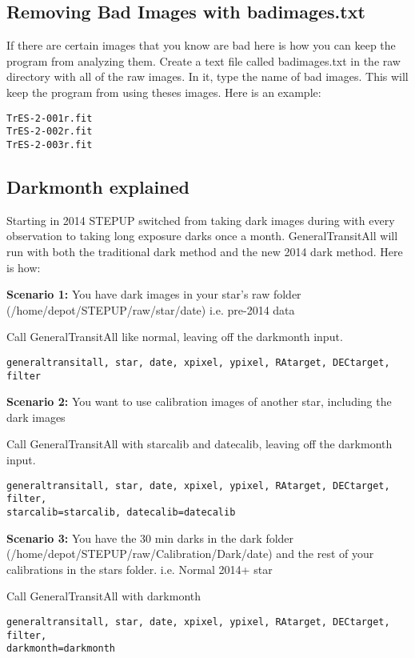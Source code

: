 \documentclass[10pt,preprint]{aastex}
\begin{document}
\subsection{Removing Bad Images with badimages.txt}

If there are certain images that you know are bad here is how you can keep the program from analyzing them. Create a text file called badimages.txt in the raw directory with all of the raw images. In it, type the name of bad images. This will keep the program from using theses images. Here is an example: 

\begin{verbatim}
TrES-2-001r.fit
TrES-2-002r.fit
TrES-2-003r.fit
\end{verbatim}

\subsection{Darkmonth explained}
Starting in 2014 STEPUP switched from taking dark images during with every observation to taking long exposure darks once a month. GeneralTransitAll will run with both the traditional dark method and the new 2014 dark method. Here is how:


\textbf{Scenario 1:} You have dark images in your star's raw folder (/home/depot/STEPUP/raw/star/date) i.e. pre-2014 data

Call GeneralTransitAll like normal, leaving off the darkmonth input.
\begin{verbatim}
generaltransitall, star, date, xpixel, ypixel, RAtarget, DECtarget, filter
\end{verbatim}

\textbf{Scenario 2:} You want to use calibration images of another star, including the dark images

Call GeneralTransitAll with starcalib and datecalib, leaving off the darkmonth input.
\begin{verbatim}
generaltransitall, star, date, xpixel, ypixel, RAtarget, DECtarget, filter,
starcalib=starcalib, datecalib=datecalib
\end{verbatim}

\textbf{Scenario 3:} You have the 30 min darks in the dark folder (/home/depot/STEPUP/raw/Calibration/Dark/date) and the rest of your calibrations in the stars folder. i.e. Normal 2014+ star 

Call GeneralTransitAll with darkmonth
\begin{verbatim}
generaltransitall, star, date, xpixel, ypixel, RAtarget, DECtarget, filter,
darkmonth=darkmonth
\end{verbatim}
\end{document}
